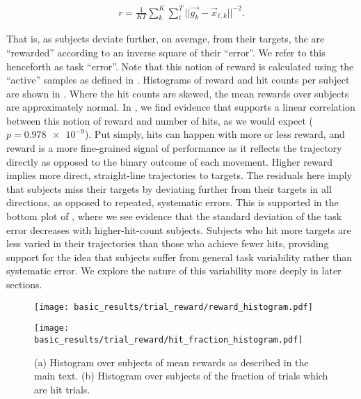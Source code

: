 \documentclass[../main.tex]{subfiles}
\begin{document}
\begin{align}
    r = \frac{1}{KT}\sum_k^K\sum_t^T{|| \vec{g_k} - \vec{x}_{t,k} ||^{-2}}.
    \label{eq:reward}
\end{align}

That is, as subjects deviate further, on average, from their targets, the are ``rewarded'' according to an inverse square of their ``error''. We refer to this henceforth as task ``error''. Note that this notion of reward is calculated using the ``active'' samples as defined in . Histograms of reward and hit counts per subject are shown in . Where the hit counts are skewed, the mean rewards over subjects are approximately normal. In , we find evidence that supports a linear correlation between this notion of reward and number of hits, as we would expect ($p=\num{0.978e-9}$). Put simply, hits can happen with more or less reward, and reward is a more fine-grained signal of performance as it reflects the trajectory directly as opposed to the binary outcome of each movement. Higher reward implies more direct, straight-line trajectories to targets. The residuals here imply that subjects miss their targets by deviating further from their targets in all directions, as opposed to repeated, systematic errors. This is supported in the bottom plot of , where we see evidence that the standard deviation of the task error decreases with higher-hit-count subjects. Subjects who hit more targets are less varied in their trajectories than those who achieve fewer hits, providing support for the idea that subjects suffer from general task variability rather than systematic error. We explore the nature of this variability more deeply in later sections.

\begin{figure}[!htb]%
    \centering
    \begin{minipage}{0.49\textwidth}
        \texttt{[image: basic\_results/trial\_reward/reward\_histogram.pdf]}
        \subcaption{}
    \end{minipage}
    \begin{minipage}{0.49\textwidth}
        \texttt{[image: basic\_results/trial\_reward/hit\_fraction\_histogram.pdf]}
      \subcaption{}
    \end{minipage}
    \caption[Hit and reward histograms]{(a) Histogram over subjects of mean rewards as described in the main text. (b) Histogram over subjects of the fraction of trials which are hit trials.}\label{fig:reward_histograms}
\end{figure}
\end{document}

